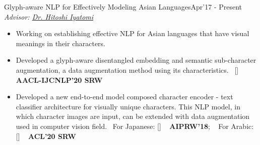 \begin{projects}
\project
	{Glyph-aware NLP for Effectively Modeling Asian Languages}{Apr'17 - Present}
	{
	    \textit{Advisor:  \href{https://iyatomi-lab.info/english/people/2013-6-8}{Dr. Hitoshi Iyatomi}}
	}
	{\begin{itemize}
	\setlength\itemsep{0.3em}
     \item Working on establishing effective NLP for Asian languages that have visual meanings in their characters.
     \item Developed a glyph-aware disentangled embedding and semantic sub-character augmentation, a data augmentation method using its characteristics.~ [\href{https://github.com/IyatomiLab/GDCE-SSA}{\small{\githubSymbol}}] ~ {\small{\lbrack\textbf{{AACL-IJCNLP'20 SRW}}\rbrack}}
     \item Developed a new end-to-end model composed character encoder - text classifier architecture for visually unique characters. This NLP model, in which character images are input, can be extended with data augmentation used in computer vision field.~ For Japanese: [\href{https://github.com/IyatomiLab/CE-CLCNN}{\small{\githubSymbol}}] ~ {\small{\lbrack\textbf{{AIPRW'18}}\rbrack}}; ~ For Arabic: [\href{https://github.com/mahmouddaif/AraDIC}{\small{\githubSymbol}}] ~ {\small{\lbrack\textbf{{ACL'20 SRW}}\rbrack}}
     \end{itemize}}     

\end{projects}    

